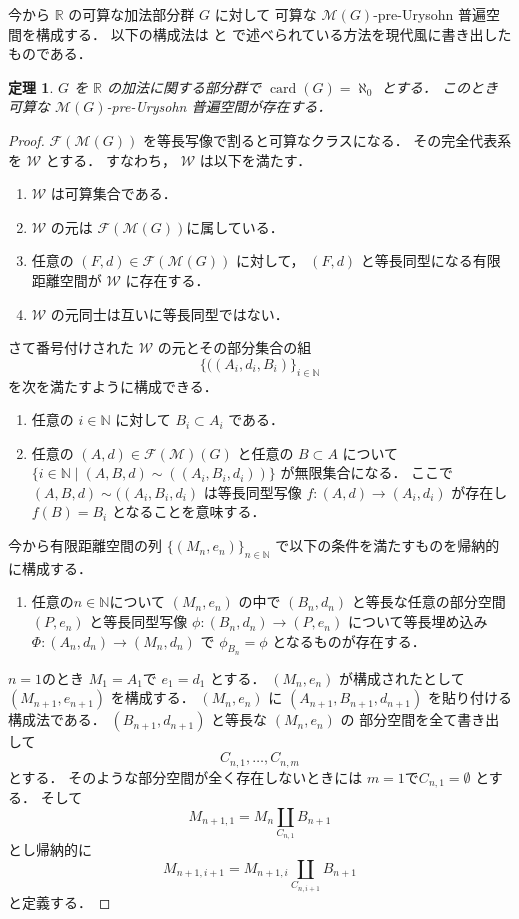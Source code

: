 \documentclass[leqno, 12pt]{jsarticle}
\newtheorem{thm}{定理}[section]
\newcommand{\nn}{\mathbb{N}}
\newcommand{\rr}{\mathbb{R}}
\DeclareMathOperator{\card}{card}
\begin{document}
今から
$\rr$
の可算な加法部分群
$G$
に対して
可算な
$\mathscr{M}(G)$-pre-Urysohn
普遍空間を構成する．
以下の構成法は
 \cite{Ury1}
 と 
 \cite{Ury2}
で述べられている方法を現代風に書き出したものである．
\begin{thm}\label{thm:amal:exist} 
$G$
を
$\rr$
の加法に関する部分群で
$\card(G)=\aleph_0$
とする．
このとき
可算な
$\mathscr{M}(G)$-pre-Urysohn
普遍空間が存在する．
\end{thm}
\begin{proof}
$\mathscr{F}(\mathscr{M}(G))$
を等長写像で割ると可算なクラスになる．
その完全代表系を
$\mathcal{W}$
とする．
すなわち，
$\mathcal{W}$
は以下を満たす．
\begin{enumerate}
\item 
$\mathcal{W}$
は可算集合である．
\item 
$\mathcal{W}$
の元は
$\mathscr{F}(\mathscr{M}(G))$に属している．
\item 
任意の
$(F, d)\in \mathscr{F}(\mathscr{M}(G))$
に対して，
$(F, d)$
と等長同型になる有限距離空間が
$\mathcal{W}$
に存在する．
\item 
$\mathcal{W}$
の元同士は互いに等長同型ではない．
\end{enumerate}



さて番号付けされた
$\mathcal{W}$
の元とその部分集合の組
\[
\{((A_i, d_i, B_i)\}_{i\in \nn}
\]
を次を満たすように構成できる．
\begin{enumerate}
\item 
任意の
$i\in \nn$
に対して
$B_{i}\subset A_{i}$
である．
\item 
任意の
$(A, d)\in \mathscr{F}(\mathscr{M})(G)$
と任意の
$B\subset A$
について
$\{i\in \nn\mid (A, B, d)\sim((A_i, B_i, d_i))\}$
が無限集合になる．
ここで
$(A, B, d)\sim((A_{i}, B_{i}, d_{i})$
は等長同型写像
$f\colon  (A, d)\to (A_{i}, d_{i})$
が存在し
$f(B)=B_{i}$
となることを意味する．
\end{enumerate}


今から有限距離空間の列
$\{(M_{n}, e_{n})\}_{n\in \nn}$
で以下の条件を満たすものを帰納的に構成する．
\begin{enumerate}
\item 任意の$n\in \nn$について
$(M_{n}, e_{n})$
の中で
$(B_{n}, d_{n})$
と等長な任意の部分空間
$(P, e_{n})$
と等長同型写像
$\phi\colon  (B_{n}, d_{n})\to (P, e_{n})$
について等長埋め込み
$\Phi\colon  (A_{n}, d_{n})\to (M_{n}, d_{n})$
で
$\phi_{B_{n}}=\phi$
となるものが存在する．
\end{enumerate}
$n=1$のとき
$M_{1}=A_{1}$で
$e_{1}=d_{1}$
とする．
$(M_{n}, e_{n})$
が構成されたとして
$(M_{n+1}, e_{n+1})$
を構成する．
$(M_{n}, e_{n})$
に
$(A_{n+1}, B_{n+1}, d_{n+1})$
を貼り付ける構成法である．
$(B_{n+1}, d_{n+1})$
と等長な
$(M_{n}, e_{n})$
の
部分空間を全て書き出して
\[
C_{n, 1}, \dots, C_{n, m}
\]
とする．
そのような部分空間が全く存在しないときには
$m=1$で$C_{n, 1}=\emptyset$
とする．
そして
\[
M_{n+1, 1}=M_{n}\coprod_{C_{n, 1}}B_{n+1}
\]
とし帰納的に
\[
M_{n+1, i+1}=M_{n+1, i}\coprod_{C_{n, i+1}}B_{n+1}
\]
と定義する．


\end{proof}
\end{document}
